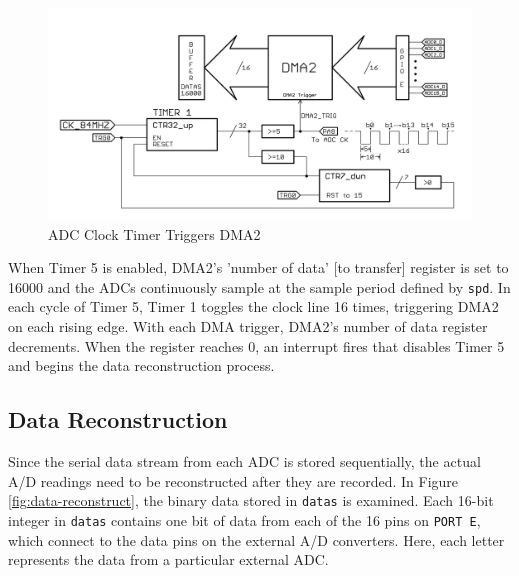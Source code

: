 \begin{figure}[H]
  \begin{center}
      \includegraphics[width=1\textwidth]{../ADC-DMA.png}
      \caption{ADC Clock Timer Triggers DMA2}
  \end{center}
\end{figure}

When Timer 5 is enabled, DMA2's 'number of data' [to transfer] register is set to 16000  and the ADCs continuously sample at the sample period defined by \texttt{spd}.
In each cycle of Timer 5, Timer 1 toggles the clock line 16 times, triggering DMA2 on each rising edge.
With each DMA trigger, DMA2's number of data register decrements.
When the register reaches 0, an interrupt fires that disables Timer 5 and begins the data reconstruction process.


\subsection{Data Reconstruction}

Since the serial data stream from each ADC is stored sequentially, the actual A/D readings need to be reconstructed after they are recorded.
In Figure \ref{fig:data-reconstruct}, the binary data stored in \texttt{datas} is examined.
Each 16-bit integer in \texttt{datas} contains one bit of data from each of the 16 pins on \texttt{PORT E}, which connect to the data pins on the external A/D converters.
Here, each letter represents the data from a particular external ADC.

